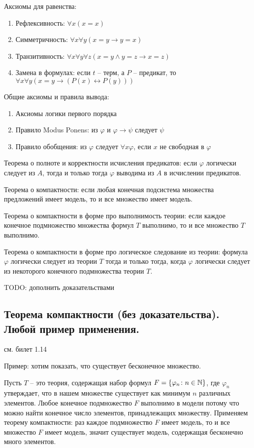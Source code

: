 \documentclass[a4paper, 10pt]{article}
\begin{document}
Аксиомы для равенства:

\begin{enumerate}
    \item Рефлексивность: $\forall x (x=x)$
    \item Симметричность: $\forall x \forall y (x=y \to y=x)$
    \item Транзитивность: $\forall x\forall y\forall z (x=y\land y=z \to x=z)$
    \item Замена в формулах: если $t$ -- терм, а $P$ -- предикат, то $\forall x\forall y (x=y \to (P(x)\leftrightarrow P(y)))$
\end{enumerate}

Общие аксиомы и правила вывода:

\begin{enumerate}
    \item Аксиомы логики первого порядка
    \item Правило Modus Ponens: из $\varphi$ и $\varphi\to\psi$ следует $\psi$
    \item Правило обобщения: из $\varphi$ следует $\forall x\varphi$, если $x$ не свободная в $\varphi$
\end{enumerate}

Теорема о полноте и корректности исчисления предикатов: если $\varphi$ логически следует из $A$, тогда и только тогда $\varphi$ выводима из $A$ в исчислении предикатов.

\hfill

Теорема о компактности: если любая конечная подсистема множества предложений имеет модель, то и все множество имеет модель.

Теорема о компактности в форме про выполнимость теории: если каждое конечное подмножество множества формул $T$ выполнимо, то и все множество $T$ выполнимо.

Теорема о компактности в форме про логическое следование из теории: формула $\varphi$ логически следует из теории $T$ тогда и только тогда, когда $\varphi$ логически следует из некоторого конечного подмножества теории $T$.

TODO: дополнить доказательствами

\subsection{Теорема компактности (без доказательства). Любой пример применения.}

см. билет 1.14

Пример: хотим показать, что существует бесконечное множество.

Пусть $T$ -- это теория, содержащая набор формул $F=\{\varphi_n \colon n \in \mathbb{N}\}$, где $\varphi_n$ утверждает, что в нашем множестве существует как минимум $n$ различных элементов. Любое конечное подмножество $F$ выполнимо в модели потому что можно найти конечное число элементов, принадлежащих множеству. Применяем теорему компактности: раз каждое подмножество $F$ имеет модель, то и все множество $F$ имеет модель, значит существует модель, содержащая бесконечно много элементов.
\end{document}
